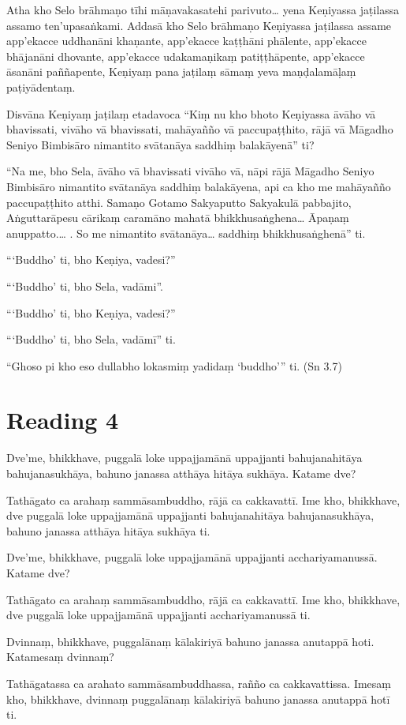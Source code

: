 Atha kho Selo brāhmaṇo tīhi māṇavakasatehi parivuto… yena Keṇiyassa jaṭilassa assamo ten’upasaṅkami. Addasā kho Selo brāhmaṇo Keṇiyassa jaṭilassa assame app’ekacce uddhanāni khaṇante, app’ekacce kaṭṭhāni phālente, app’ekacce bhājanāni dhovante, app’ekacce udakamaṇikaṃ patiṭṭhāpente, app’ekacce āsanāni paññapente, Keṇiyaṃ pana jaṭilaṃ sāmaṃ yeva maṇḍalamāḷaṃ paṭiyādentaṃ.

Disvāna Keṇiyaṃ jaṭilaṃ etadavoca “Kiṃ nu kho bhoto Keṇiyassa āvāho vā bhavissati, vivāho vā bhavissati, mahāyañño vā paccupaṭṭhito, rājā vā Māgadho Seniyo Bimbisāro nimantito svātanāya saddhiṃ balakāyenā” ti?

“Na me, bho Sela, āvāho vā bhavissati vivāho vā, nāpi rājā Māgadho Seniyo Bimbisāro nimantito svātanāya saddhiṃ balakāyena, api ca kho me mahāyañño paccupaṭṭhito atthi. Samaṇo Gotamo Sakyaputto Sakyakulā pabbajito, Aṅguttarāpesu cārikaṃ caramāno mahatā bhikkhusaṅghena… Āpaṇaṃ anuppatto.… . So me nimantito svātanāya… saddhiṃ bhikkhusaṅghenā” ti.

“‘Buddho’ ti, bho Keṇiya, vadesi?”

“‘Buddho’ ti, bho Sela, vadāmi”.

“‘Buddho’ ti, bho Keṇiya, vadesi?”

“‘Buddho’ ti, bho Sela, vadāmī” ti.

“Ghoso pi kho eso dullabho lokasmiṃ yadidaṃ ‘buddho’” ti. \hfill(Sn 3.7)

\section*{Reading 4}

Dve’me, bhikkhave, puggalā loke uppajjamānā uppajjanti bahujanahitāya bahujanasukhāya, bahuno janassa atthāya hitāya sukhāya. Katame dve?

Tathāgato ca arahaṃ sammāsambuddho, rājā ca cakkavattī. Ime kho, bhikkhave, dve puggalā loke uppajjamānā uppajjanti bahujanahitāya bahujanasukhāya, bahuno janassa atthāya hitāya sukhāya ti.

Dve’me, bhikkhave, puggalā loke uppajjamānā uppajjanti acchariyamanussā. Katame dve?

Tathāgato ca arahaṃ sammāsambuddho, rājā ca cakkavattī. Ime kho, bhikkhave, dve puggalā loke uppajjamānā uppajjanti acchariyamanussā ti.

Dvinnaṃ, bhikkhave, puggalānaṃ kālakiriyā bahuno janassa anutappā hoti. Katamesaṃ dvinnaṃ?

Tathāgatassa ca arahato sammāsambuddhassa, rañño ca cakkavattissa. Imesaṃ kho, bhikkhave, dvinnaṃ puggalānaṃ kālakiriyā bahuno janassa anutappā hotī ti.

